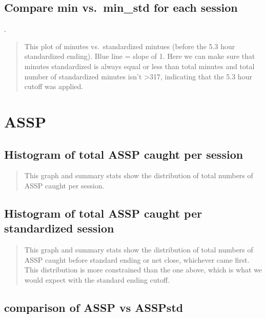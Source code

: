 \documentclass[
]{article}
\begin{document}
\hypertarget{compare-min-vs.-min_std-for-each-session}{%
\subsection{Compare min vs.~min\_std for each
session}\label{compare-min-vs.-min_std-for-each-session}}

.

\begin{quote}
This plot of minutes vs.~standardized mintues (before the 5.3 hour
standardized ending). Blue line = slope of 1. Here we can make sure that
minutes standardized is always equal or less than total minutes and
total number of standardized minutes isn't \textgreater{}317, indicating
that the 5.3 hour cutoff was applied.
\end{quote}

\hypertarget{assp}{%
\section{ASSP}\label{assp}}

\hypertarget{histogram-of-total-assp-caught-per-session}{%
\subsection{Histogram of total ASSP caught per
session}\label{histogram-of-total-assp-caught-per-session}}

\begin{quote}
This graph and summary stats show the distribution of total numbers of
ASSP caught per session.
\end{quote}

\hypertarget{histogram-of-total-assp-caught-per-standardized-session}{%
\subsection{Histogram of total ASSP caught per standardized
session}\label{histogram-of-total-assp-caught-per-standardized-session}}

\begin{quote}
This graph and summary stats show the distribution of total numbers of
ASSP caught before standard ending or net close, whichever came first.
This distribution is more constrained than the one above, which is what
we would expect with the standard ending cutoff.
\end{quote}

\hypertarget{comparison-of-assp-vs-asspstd}{%
\subsection{comparison of ASSP vs
ASSPstd}\label{comparison-of-assp-vs-asspstd}}
\end{document}
